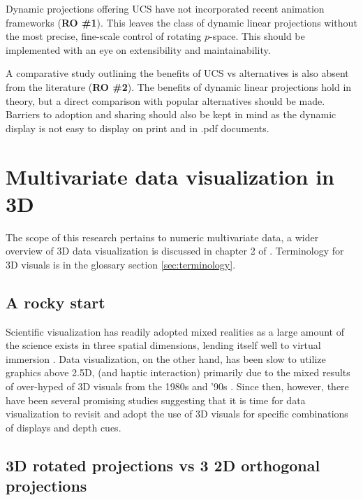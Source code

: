 \documentclass{template/monashthesis}
\begin{document}
Dynamic projections offering UCS have not incorporated recent animation frameworks (\textbf{RO \#1}). This leaves the class of dynamic linear projections without the most precise, fine-scale control of rotating \(p\)-space. This should be implemented with an eye on extensibility and maintainability.

A comparative study outlining the benefits of UCS vs alternatives is also absent from the literature (\textbf{RO \#2}). The benefits of dynamic linear projections hold in theory, but a direct comparison with popular alternatives should be made. Barriers to adoption and sharing should also be kept in mind as the dynamic display is not easy to display on print and in .pdf documents.

\hypertarget{sec:3d}{%
\section{Multivariate data visualization in 3D}\label{sec:3d}}

The scope of this research pertains to numeric multivariate data, a wider overview of 3D data visualization is discussed in chapter 2 of \textcite{marriott_immersive_2018}. Terminology for 3D visuals is in the glossary section \ref{sec:terminology}.

\hypertarget{a-rocky-start}{%
\subsection{A rocky start}\label{a-rocky-start}}

Scientific visualization has readily adopted mixed realities as a large amount of the science exists in three spatial dimensions, lending itself well to virtual immersion \autocite{marriott_immersive_2018}. Data visualization, on the other hand, has been slow to utilize graphics above 2.5D, (and haptic interaction) primarily due to the mixed results of over-hyped of 3D visuals from the 1980s and '90s \autocite{munzner_visualization_2014}. Since then, however, there have been several promising studies suggesting that it is time for data visualization to revisit and adopt the use of 3D visuals for specific combinations of displays and depth cues.

\hypertarget{d-rotated-projections-vs-3-2d-orthogonal-projections}{%
\subsection{3D rotated projections vs 3 2D orthogonal projections}\label{d-rotated-projections-vs-3-2d-orthogonal-projections}}
\end{document}
